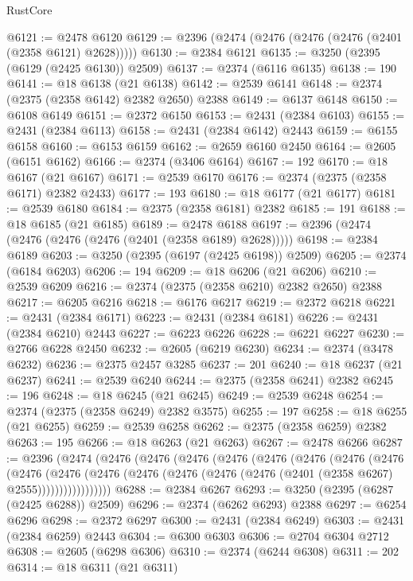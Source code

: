 \begin{lexlean}{RustCore}
\begin{coremodule}
@6121 := @2478 @6120
@6129 := @2396 (@2474 (@2476 (@2476 (@2476 (@2401 (@2358 @6121) @2628)))))
@6130 := @2384 @6121
@6135 := @3250 (@2395 (@6129 (@2425 @6130)) @2509)
@6137 := @2374 (@6116 @6135)
@6138 := 190
@6141 := @18 @6138 (@21 @6138)
@6142 := @2539 @6141
@6148 := @2374 (@2375 (@2358 @6142) @2382 @2650) @2388
@6149 := @6137 @6148
@6150 := @6108 @6149
@6151 := @2372 @6150
@6153 := @2431 (@2384 @6103)
@6155 := @2431 (@2384 @6113)
@6158 := @2431 (@2384 @6142) @2443
@6159 := @6155 @6158
@6160 := @6153 @6159
@6162 := @2659 @6160 @2450
@6164 := @2605 (@6151 @6162)
@6166 := @2374 (@3406 @6164)
@6167 := 192
@6170 := @18 @6167 (@21 @6167)
@6171 := @2539 @6170
@6176 := @2374 (@2375 (@2358 @6171) @2382 @2433)
@6177 := 193
@6180 := @18 @6177 (@21 @6177)
@6181 := @2539 @6180
@6184 := @2375 (@2358 @6181) @2382
@6185 := 191
@6188 := @18 @6185 (@21 @6185)
@6189 := @2478 @6188
@6197 := @2396 (@2474 (@2476 (@2476 (@2476 (@2401 (@2358 @6189) @2628)))))
@6198 := @2384 @6189
@6203 := @3250 (@2395 (@6197 (@2425 @6198)) @2509)
@6205 := @2374 (@6184 @6203)
@6206 := 194
@6209 := @18 @6206 (@21 @6206)
@6210 := @2539 @6209
@6216 := @2374 (@2375 (@2358 @6210) @2382 @2650) @2388
@6217 := @6205 @6216
@6218 := @6176 @6217
@6219 := @2372 @6218
@6221 := @2431 (@2384 @6171)
@6223 := @2431 (@2384 @6181)
@6226 := @2431 (@2384 @6210) @2443
@6227 := @6223 @6226
@6228 := @6221 @6227
@6230 := @2766 @6228 @2450
@6232 := @2605 (@6219 @6230)
@6234 := @2374 (@3478 @6232)
@6236 := @2375 @2457 @3285
@6237 := 201
@6240 := @18 @6237 (@21 @6237)
@6241 := @2539 @6240
@6244 := @2375 (@2358 @6241) @2382
@6245 := 196
@6248 := @18 @6245 (@21 @6245)
@6249 := @2539 @6248
@6254 := @2374 (@2375 (@2358 @6249) @2382 @3575)
@6255 := 197
@6258 := @18 @6255 (@21 @6255)
@6259 := @2539 @6258
@6262 := @2375 (@2358 @6259) @2382
@6263 := 195
@6266 := @18 @6263 (@21 @6263)
@6267 := @2478 @6266
@6287 := @2396
    (@2474
      (@2476
        (@2476
          (@2476
            (@2476
              (@2476
                (@2476
                  (@2476
                    (@2476
                      (@2476
                        (@2476
                          (@2476
                            (@2476 (@2476 (@2476 (@2476 (@2401 (@2358 @6267) @2555)))))))))))))))))
@6288 := @2384 @6267
@6293 := @3250 (@2395 (@6287 (@2425 @6288)) @2509)
@6296 := @2374 (@6262 @6293) @2388
@6297 := @6254 @6296
@6298 := @2372 @6297
@6300 := @2431 (@2384 @6249)
@6303 := @2431 (@2384 @6259) @2443
@6304 := @6300 @6303
@6306 := @2704 @6304 @2712
@6308 := @2605 (@6298 @6306)
@6310 := @2374 (@6244 @6308)
@6311 := 202
@6314 := @18 @6311 (@21 @6311)

\end{coremodule}
\end{lexlean}
